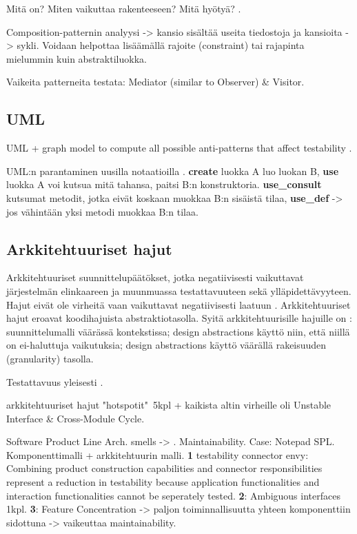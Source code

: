 \documentclass[finnish]{tktltiki2}
\theoremstyle{definition}
\theoremstyle{remark}
\begin{document}
Mitä on? Miten vaikuttaa rakenteeseen? Mitä  hyötyä? \citep{baudry_measuring_2003}.

Composition-patternin analyysi -> kansio sisältää useita tiedostoja ja kansioita -> sykli. Voidaan helpottaa lisäämällä rajoite (constraint) tai rajapinta mielummin kuin abstraktiluokka. 

Vaikeita patterneita testata: Mediator (similar to Observer) \& Visitor.

\subsection{UML}

UML + graph model to compute all possible anti-patterns that affect testability \citep{baudry_testability_2002}.

UML:n parantaminen uusilla notaatioilla \citep[s. 4]{baudry_measuring_2003}. \textbf{create}  luokka A luo luokan B, \textbf{use}  luokka A voi kutsua mitä tahansa, paitsi B:n konstruktoria. \textbf{use\_consult}  kutsumat metodit, jotka eivät koskaan muokkaa B:n sisäistä tilaa, \textbf{use\_def} -> jos vähintään yksi metodi muokkaa B:n tilaa.




\subsection{Arkkitehtuuriset hajut}

Arkkitehtuuriset suunnittelupäätökset, jotka negatiivisesti vaikuttavat järjestelmän elinkaareen ja muunmuassa testattavuuteen sekä ylläpidettävyyteen. Hajut eivät ole virheitä vaan vaikuttavat negatiivisesti laatuun \citep[s. 1]{de_andrade_architectural_2014}. Arkkitehtuuriset hajut eroavat koodihajuista abstraktiotasolla. Syitä arkkitehtuurisille hajuille on \citep[s. 2]{de_andrade_architectural_2014}: suunnittelumalli väärässä kontekstissa; design abstractions käyttö niin, että niillä on ei-haluttuja vaikutuksia; design abstractions käyttö väärällä rakeisuuden (granularity) tasolla. 

Testattavuus \citep{garcia_identifying_2009} yleisesti \citep{bertran_detecting_2011}.

\citep{HotSpot} arkkitehtuuriset hajut "hotspotit"\ 5kpl + kaikista altin virheille oli \citep[s. 57]{HotSpot} Unstable Interface \& Cross-Module Cycle.

Software Product Line Arch. smells -> \citep{de_andrade_architectural_2014}. Maintainability. Case: Notepad SPL. Komponenttimalli + arkkitehtuurin malli. \textbf{1} testability connector envy: Combining product construction capabilities and connector responsibilities represent a reduction in testability because application functionalities and interaction functionalities cannot be seperately tested. \textbf{2}: Ambiguous interfaces 1kpl. \textbf{3}: Feature Concentration -> paljon toiminnallisuutta yhteen komponenttiin sidottuna -> vaikeuttaa maintainability.  
\end{document}
